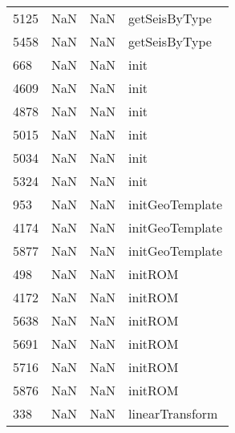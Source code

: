 \begin{tabular}{llll}
5125 &                   NaN &                        NaN &                             getSeisByType \\
5458 &                   NaN &                        NaN &                             getSeisByType \\
668  &                   NaN &                        NaN &                                      init \\
4609 &                   NaN &                        NaN &                                      init \\
4878 &                   NaN &                        NaN &                                      init \\
5015 &                   NaN &                        NaN &                                      init \\
5034 &                   NaN &                        NaN &                                      init \\
5324 &                   NaN &                        NaN &                                      init \\
953  &                   NaN &                        NaN &                           initGeoTemplate \\
4174 &                   NaN &                        NaN &                           initGeoTemplate \\
5877 &                   NaN &                        NaN &                           initGeoTemplate \\
498  &                   NaN &                        NaN &                                   initROM \\
4172 &                   NaN &                        NaN &                                   initROM \\
5638 &                   NaN &                        NaN &                                   initROM \\
5691 &                   NaN &                        NaN &                                   initROM \\
5716 &                   NaN &                        NaN &                                   initROM \\
5876 &                   NaN &                        NaN &                                   initROM \\
338  &                   NaN &                        NaN &                           linearTransform \\

\end{tabular}
